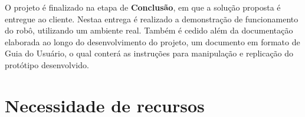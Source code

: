 O projeto é finalizado na etapa de \textbf{Conclusão}, em que a solução proposta é entregue ao cliente. Nestaa entrega é realizado a demonstração de funcionamento do robô, utilizando um ambiente real. Também é cedido além da documentação elaborada ao longo do desenvolvimento do projeto, um documento em formato de Guia do Usuário, o qual conterá as instruções para manipulação e replicação do protótipo desenvolvido.        
\section{Necessidade de recursos}

